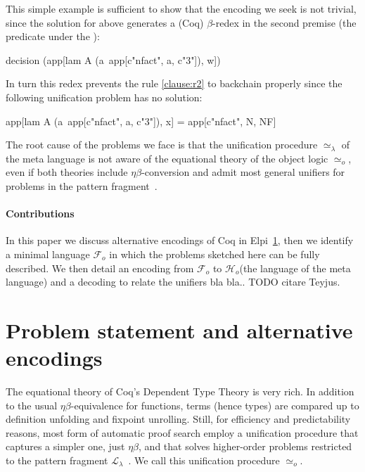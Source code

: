 \documentclass[sigconf,natbib=false]{acmart}
\newcommand{\UnifRel}{\ensuremath{\simeq}}
\newcommand{\Uo}{\ensuremath{\UnifRel_o}\xspace}
\newcommand{\Ue}{\ensuremath{\UnifRel_\lambda}\xspace}
\newcommand{\Fo}{\ensuremath{\mathcal{F}_{\!o}\xspace}} %
\newcommand{\Ho}{\ensuremath{\mathcal{H}_o}\xspace}
\begin{document}
\noindent
This simple example is sufficient to show that the encoding we seek
is not trivial, since the solution for  above generates a
(Coq) $\beta$-redex in the second premise (the predicate
under the \hspace{-0.8em}):

\begin{elpicode}
decision (app[lam A (a\ app[c"nfact", a, c"3"]), w])
\end{elpicode}

\noindent
In turn this redex prevents the rule \ref{clause:r2} to backchain properly since
the following unification problem has no solution:

\begin{elpicode}
app[lam A (a\ app[c"nfact", a, c"3"]), x] =
  app[c"nfact", N, NF]
\end{elpicode}

\noindent
The root cause of the problems we face is that the unification procedure
\Ue of the meta language is not aware of the equational theory of the object
logic \Uo, even if both theories include $\eta\beta$-conversion and admit most general
unifiers for problems in the pattern fragment~\cite{miller92jsc}.

\paragraph{Contributions}
In this paper we discuss alternative encodings of Coq in
Elpi~\ref{sec:encodings}, then we identify a minimal language \Fo
in which the problems sketched here can be fully described.
We then detail an encoding  from \Fo{} to \Ho (the language of
the meta language) and a decoding  to relate the unifiers
bla bla.. TODO citare Teyjus.

\section{Problem statement and alternative encodings} %
\label{sec:encodings}

The equational theory of Coq's Dependent Type Theory is very rich. In
addition to the usual $\eta\beta$-equivalence for functions, terms (hence types)
are compared up to definition unfolding and fixpoint unrolling. Still,
for efficiency and predictability reasons, most form of automatic proof search
employ a unification procedure that captures a simpler one,
just $\eta\beta$, and that solves higher-order problems
restricted to the pattern fragment $\mathcal{L}_\lambda$~\cite{miller92jsc}.
We call this unification procedure \Uo{}.
\end{document}
